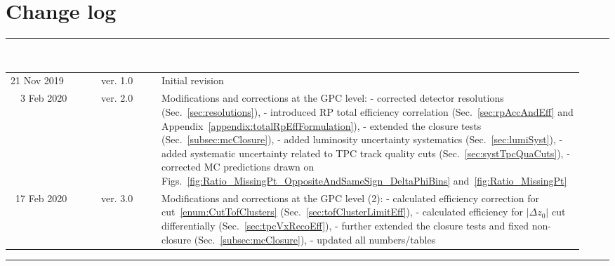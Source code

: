 \section*{\LARGE Change log}%
%
  \rule{\textwidth}{1.0pt}\\[5pt]%
  \begin{tabular}{>{\raggedright}p{0.15\linewidth}p{0.1\linewidth}p{0.7\linewidth}}
  	21 Nov 2019 & ver. 1.0 & Initial revision\\
  	~~3 Feb 2020 & ver. 2.0 & Modifications and corrections at the GPC level:%
  	\newline- corrected detector resolutions (Sec.~\ref{sec:resolutions}),%
  	\newline- introduced RP total efficiency correlation (Sec.~\ref{sec:rpAccAndEff} and Appendix~\ref{appendix:totalRpEffFormulation}),%
  	\newline- extended the closure tests (Sec.~\ref{subsec:mcClosure}),%
  	\newline- added luminosity uncertainty systematics (Sec.~\ref{sec:lumiSyst}),%
  	\newline- added systematic uncertainty related to TPC track quality cuts (Sec.~\ref{sec:systTpcQuaCuts}),%
  	\newline- corrected MC predictions drawn on Figs.~\ref{fig:Ratio_MissingPt_OppositeAndSameSign_DeltaPhiBins} and~\ref{fig:Ratio_MissingPt}\\
  	~17 Feb 2020 & ver. 3.0 & Modifications and corrections at the GPC level (2):%
  	\newline- calculated efficiency correction for cut~\ref{enum:CutTofClusters} (Sec.~\ref{sec:tofClusterLimitEff}),%
  	\newline- calculated efficiency for $|\Delta z_{0}|$ cut differentially (Sec.~\ref{sec:tpcVxRecoEff}),%
  	\newline- further extended the closure tests and fixed non-closure (Sec.~\ref{subsec:mcClosure}),%
  	\newline- updated all numbers/tables
  \end{tabular}\newline%
 \rule{\textwidth}{1.0pt}
